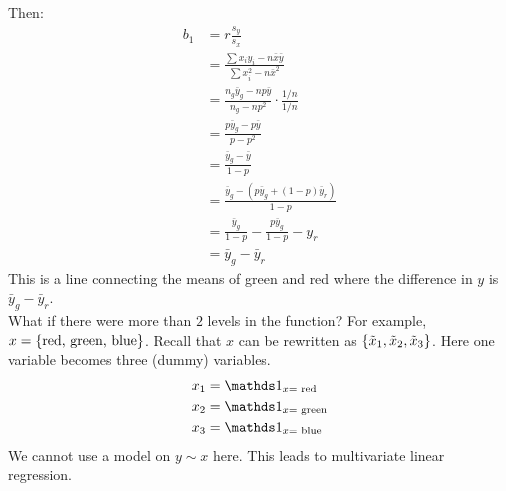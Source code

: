 \documentclass[12pt]{article}
\begin{document}
Then: 
$$ \begin{aligned} b_1 &= r\frac{s_y}{s_x} \\ &= \frac{\sum x_iy_i - n\bar{x}\bar{y}}{\sum x_i^2 - n\bar{x}^2} \\ &= \frac{n_g\bar{y}_g - np\bar{y}}{n_g - np^2} \cdot \frac{1/n}{1/n} \\ &= \frac{p\bar{y}_g - p\bar{y}}{p - p^2} \\ &= \frac{\bar{y}_g - \bar{y}}{1-p} \\ &= \frac{\bar{y}_g - (p\bar{y}_g + (1-p)\bar{y}_r)}{1-p} \\ &= \frac{\bar{y}_g}{1-p} - \frac{p\bar{y}_g}{1-p} - y_r \\ &= \bar{y}_g - \bar{y}_r \end{aligned} $$ 
This is a line connecting the means of green and red where the difference in $y$ is $\bar{y}_g - \bar{y}_r$. \\
What if there were more than $2$ levels in the function? For example, $x = \left\{ \text{red, green, blue} \right\}$. Recall that $x$ can be rewritten as $\left\{ \tilde{x}_1, \tilde{x}_2, \tilde{x}_3 \right\}$. Here one variable becomes three (dummy) variables. 
$$ \begin{aligned} x_1 &= \indicator{x = \text{ red}} \\ x_2 &= \indicator{x = \text{ green}} \\ x_3 &= \indicator{x = \text{ blue}} \end{aligned} $$ 
We cannot use a model on $y \sim x$ here. This leads to multivariate linear regression. 
\end{document}
